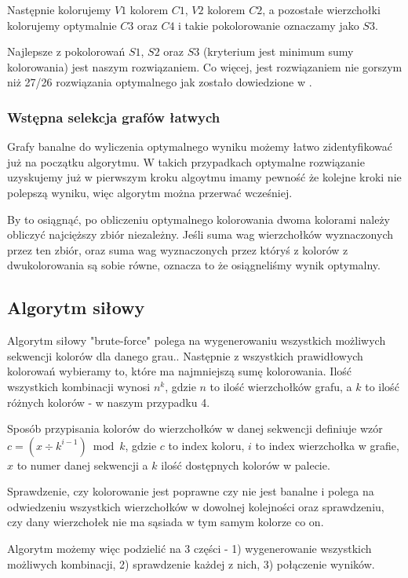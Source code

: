 \documentclass{article}
\begin{document}
Następnie kolorujemy $V1$ kolorem $C1$, $V2$ kolorem $C2$, a pozostałe wierzchołki kolorujemy optymalnie $C3$ oraz $C4$ i takie pokolorowanie oznaczamy jako $S3$.

Najlepsze z pokolorowań $S1$, $S2$ oraz $S3$ (kryterium jest minimum sumy kolorowania) jest naszym rozwiązaniem. Co więcej, jest rozwiązaniem nie gorszym niż 27/26 rozwiązania optymalnego jak zostało dowiedzione w \cite{kubale-pikies19}.

\subsubsection*{Wstępna selekcja grafów łatwych}

Grafy banalne do wyliczenia optymalnego wyniku możemy łatwo zidentyfikować już na początku algorytmu. W takich przypadkach optymalne rozwiązanie uzyskujemy już w pierwszym kroku algoytmu imamy pewność że kolejne kroki nie polepszą wyniku, więc algorytm można przerwać wcześniej.

By to osiągnąć, po obliczeniu optymalnego kolorowania dwoma kolorami należy obliczyć najcięższy zbiór niezależny. Jeśli suma wag wierzchołków wyznaczonych przez ten zbiór, oraz suma wag wyznaczonych przez któryś z kolorów z dwukolorowania są sobie równe, oznacza to że osiągneliśmy wynik optymalny.

\subsection{Algorytm siłowy}

Algorytm siłowy "brute-force" polega na wygenerowaniu wszystkich możliwych sekwencji kolorów dla danego grau.. Następnie z wszystkich prawidłowych kolorowań wybieramy to, które ma najmniejszą sumę kolorowania. Ilość wszystkich kombinacji wynosi $n^k$, gdzie $n$ to ilość wierzchołków grafu, a $k$ to ilość różnych kolorów - w naszym przypadku 4.

Sposób przypisania kolorów do wierzchołków w danej sekwencji definiuje wzór $c = (x \div k^{i-1}) \bmod k$, gdzie $c$ to index koloru, $i$ to index wierzchołka w grafie, $x$ to numer danej sekwencji a $k$ ilość dostępnych kolorów w palecie. 

Sprawdzenie, czy kolorowanie jest poprawne czy nie jest banalne i polega na odwiedzeniu wszystkich wierzchołków w dowolnej kolejności oraz sprawdzeniu, czy dany wierzchołek nie ma sąsiada w tym samym kolorze co on. 

Algorytm możemy więc podzielić na 3 części - 1) wygenerowanie wszystkich możliwych kombinacji, 2) sprawdzenie każdej z nich, 3) połączenie wyników.
\end{document}
